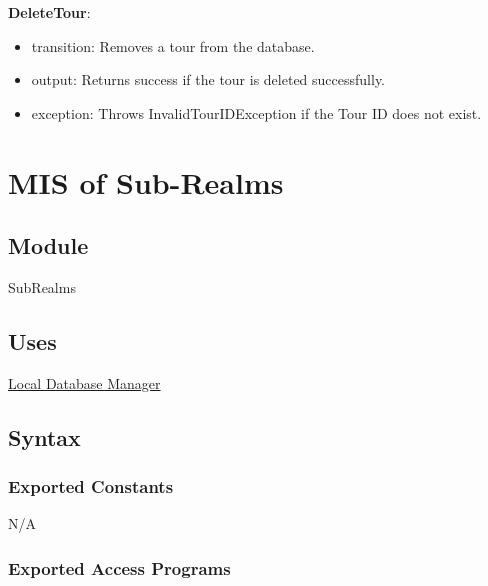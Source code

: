 \documentclass[12pt, titlepage]{article}
\begin{document}
\noindent \textbf{DeleteTour}:
\begin{itemize}
  \item transition: Removes a tour from the database.
  \item output: Returns success if the tour is deleted successfully.
  \item exception: Throws InvalidTourIDException if the Tour ID does not exist.
\end{itemize}

\newpage

\section{MIS of Sub-Realms} \label{sub-realms}

\subsection{Module}

SubRealms

\subsection{Uses}

\hyperref[local-dbm]{Local Database Manager}

\subsection{Syntax}

\subsubsection{Exported Constants}

N/A

\subsubsection{Exported Access Programs}
\end{document}
